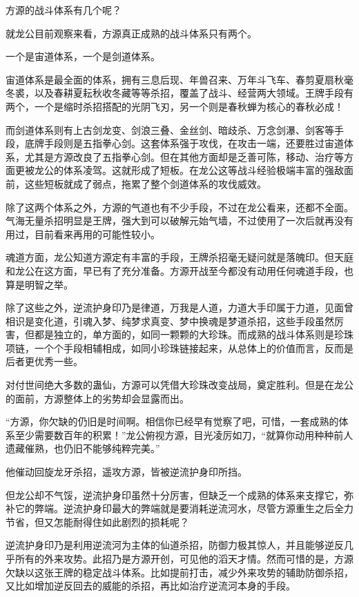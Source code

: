 
\begin{this_body}

方源的战斗体系有几个呢？

就龙公目前观察来看，方源真正成熟的战斗体系只有两个。

一个是宙道体系，一个是剑道体系。

宙道体系是最全面的体系，拥有三息后现、年兽召来、万年斗飞车、春剪夏扇秋毫冬裘，以及春耕夏耘秋收冬藏等等杀招，覆盖了战斗、经营两大领域。王牌手段有两个，一个是缩时杀招搭配的光阴飞刃，另一个则是春秋蝉为核心的春秋必成！

而剑道体系则有上古剑龙变、剑浪三叠、金丝剑、暗歧杀、万念剑瀑、剑客等手段，底牌手段则是五指拳心剑。这套体系强于攻伐，在攻击一端，还要胜过宙道体系，尤其是方源改良了五指拳心剑。但在其他方面却是乏善可陈，移动、治疗等方面更被龙公的体系凌驾。这就形成了短板。在龙公这等战斗经验极端丰富的强敌面前，这些短板就成了弱点，拖累了整个剑道体系的攻伐威效。

除了这两个体系之外，方源的气道也有不少手段，不过在龙公看来，还都不全面。气海无量杀招明显是王牌，强大到可以破解元始气墙，不过使用了一次后就再没有用过，目前看来再用的可能性较小。

魂道方面，龙公知道方源定有丰富的手段，王牌杀招毫无疑问就是落魄印。但天庭和龙公在这方面，早已有了充分准备。方源开战至今都没有动用任何魂道手段，也算是明智之举。

除了这些之外，逆流护身印乃是律道，万我是人道，力道大手印属于力道，见面曾相识是变化道，引魂入梦、纯梦求真变、梦中换魂是梦道杀招，这些手段虽然厉害，但都是独立的，单方面的，如同一颗颗的大珍珠。而成熟的战斗体系则是珍珠项链，一个个手段相辅相成，如同小珍珠链接起来，从总体上的价值而言，反而是后者更优秀一些。

对付世间绝大多数的蛊仙，方源可以凭借大珍珠改变战局，奠定胜利。但是在龙公的面前，方源整体上的劣势却会显露而出。

“方源，你欠缺的仍旧是时间啊。相信你已经早有觉察了吧，可惜，一套成熟的体系至少需要数百年的积累！”龙公俯视方源，目光凌厉如刀，“就算你动用种种前人遗藏催熟，也仍旧不能够纯粹完美。”

他催动回旋龙牙杀招，遥攻方源，皆被逆流护身印所挡。

但龙公却不气馁，逆流护身印虽然十分厉害，但缺乏一个成熟的体系来支撑它，弥补它的弊端。逆流护身印最大的弊端就是要消耗逆流河水，尽管方源重生之后全力节省，但又怎能耐得住如此剧烈的损耗呢？

逆流护身印乃是利用逆流河为主体的仙道杀招，防御力极其惊人，并且能够逆反几乎所有的外来攻势。此招乃是方源开创，可见他的滔天才情。然而可惜的是，方源欠缺以这张王牌的稳定战斗体系。比如提前打击，减少外来攻势的辅助防御杀招，又比如增加逆反回去的威能的杀招，再比如治疗逆流河本身的手段。


\end{this_body}
